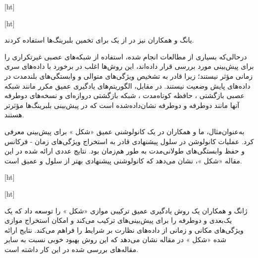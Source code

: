[ht]



[ht]


یانگ و همکاران نیز در  از یک  برای تخمین  بلبرینگ‌ها استفاده کردند.



درحالی‌که بسیاری از مطالعات انجام شده، استفاده از شبکه‌های عصبی غیرتکراری را برای پیش‌بینی  مورد بررسی قرار داده‌اند، این روش‌ها اغلب در برخورد با داده‌های سری زمانی مؤثر نیستند؛ زیرا قادر به تشخیص ویژگی‌های متوالی و وابستگی‌های بلندمدت در داده‌های پایش وضعیت نیستند. در مقابل، الگوریتم‌های یادگیری عمیق مکرر مانند شبکه عصبی بازگشتی ، حافظه کوتاه‌مدت ، شبکه بازگشتی دروازه‌ای  و نسخه‌های دوطرفه آنها مانند  دوطرفه  و  دوطرفه نشان‌داده‌شده است که در پیش‌بینی  بلبرینگ‌ها مؤثرتر هستند. 





به‌عنوان‌مثال، ما و همکاران در  یک  کانولوشنی عمیق «شکل » برای پیش‌بینی  معرفی کرد. عملیات کانولوشن در سلول  پیشنهادی قادر به استخراج ویژگی‌های زمان - فرکانس و حفظ وابستگی‌های طولانی‌مدت به طور هم‌زمان بود. نتایج عددی ارائه شده در این مقاله «شکل »، نشان می‌دهد که  کانولوشنی پیشنهادی بهتر از سلول  و  عمیق است. 


[ht]



[ht]





ژانگ و همکاران  یک روش یادگیری عمیق ترکیبی موازی «شکل » را توسعه داد که یک  یک‌بعدی و  دوطرفه را برای پیش‌بینی‌های  ترکیب می‌کند و امکان استخراج موازی ویژگی‌های مکانی و زمانی از داده‌های نظارت بر شرایط را فراهم می‌کند. نتایج ارائه شده «شکل » در مقاله نشان می‌دهد که این روش بهبود خوبی نسبت به سایر مقاله‌های بررسی شده در این کار داشته است.



